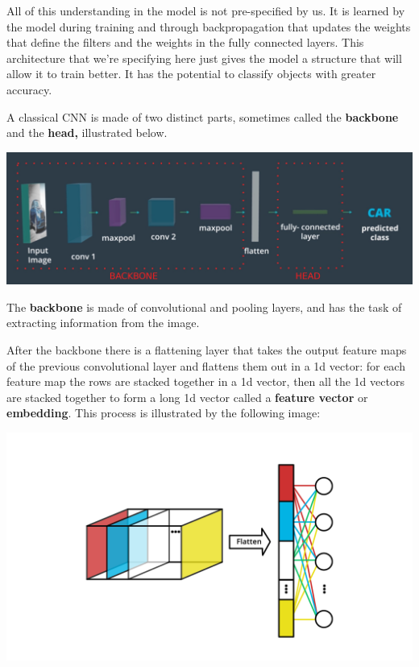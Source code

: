 All of this understanding in the model is not pre-specified by us. It is learned by the model during training and through backpropagation that updates the weights that define
the filters and the weights in the fully connected layers. This architecture that we're specifying here just gives the model a structure that will allow it to train better. It has the potential to classify objects with greater accuracy.\newline

A classical CNN is made of two distinct parts, sometimes called the \textbf{backbone} and the \textbf{head,} illustrated below.

\includegraphics[width=1\linewidth]{img//cnn//depth/cnn-structure-complete.jpeg}

The \textbf{backbone} is made of convolutional and pooling layers, and has the task of extracting information from the image. \newline

After the backbone there is a flattening layer that takes the output feature maps of the previous convolutional layer and flattens them out in a 1d vector: for each feature map the rows are stacked together in a 1d vector, then all the 1d vectors are stacked together to form a long 1d vector called a \textbf{feature vector} or \textbf{embedding}. This process is illustrated by the following image:

\includegraphics[width=0.75\linewidth]{img//cnn//depth/dlnd-refresh-c2-cd1821-l2-1.png}

